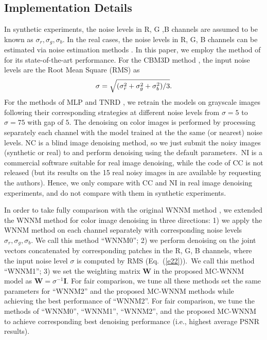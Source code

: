 \documentclass[10pt,twocolumn,letterpaper,sort&compress]{article}
\begin{document}
\subsection{Implementation Details}
In synthetic experiments, the noise levels in R, G ,B channels are assumed to be known as $\sigma_{r}, \sigma_{g}, \sigma_{b}$. In the real cases, the noise levels in R, G, B channels can be estimated via noise estimation methods \cite{noiselevel,Chen2015ICCV}. In this paper, we employ the method of \cite{Chen2015ICCV} for its state-of-the-art performance. For the CBM3D method \cite{cbm3d}, the input noise levels are the Root Mean Square (RMS) as 
\vspace{-3mm}
\begin{equation}
\label{e22}
\vspace{-3mm}
\sigma = \sqrt{(\sigma_{r}^{2}+\sigma_{g}^{2}+\sigma_{b}^{2})/3}.
\end{equation}
For the methods of MLP \cite{mlp} and TNRD \cite{chen2015learning}, we retrain the models on grayscale images following their corresponding strategies at different noise levels from $\sigma=5$ to $\sigma=75$ with gap of $5$. The denoising on color images is performed by processing separately each channel with the model trained at the the same (or nearest) noise levels. NC \cite{noiseclinic,ncwebsite} is a blind image denoising method, so we just submit the noisy images (synthetic or real) to \cite{ncwebsite} and perform denoising using the default parameters.\ NI \cite{neatimage} is a commercial software suitable for real image denoising, while the code of CC \cite{crosschannel2016} is not released (but its results on the 15 real noisy images in \cite{crosschannel2016} are available by requesting the authors). Hence, we only compare with CC and NI in real image denoising experiments, and do not compare with them in synthetic experiments. 

In order to take fully comparison with the original WNNM method \cite{wnnmijcv}, we extended the WNNM method \cite{wnnmijcv} for color image denoising in three directions: 1) we apply the WNNM method \cite{wnnmijcv} on each channel separately with corresponding noise levels $\sigma_{r}, \sigma_{g}, \sigma_{b}$. We call this method ``WNNM0''; 2) we perform denoising on the joint vectors concatenated by corresponding patches in the R, G, B channels, where the input noise level $\sigma$ is computed by RMS (Eq.\ (\ref{e22})).\ We call this method ``WNNM1''; 3) we set the weighting matrix $\mathbf{W}$ in the proposed MC-WNNM model as $\mathbf{W}=\sigma^{-1}\mathbf{I}$. For fair comparison, we tune all these methods set the same parameters for ``WNNM2'' and the proposed MC-WNNM methods while achieving the best performance of ``WNNM2''. For fair comparison, we tune the methods of ``WNNM0'', ``WNNM1'', ``WNNM2'', and the proposed MC-WNNM to achieve corresponding best denoising performance (i.e., highest average PSNR results). 
\end{document}
